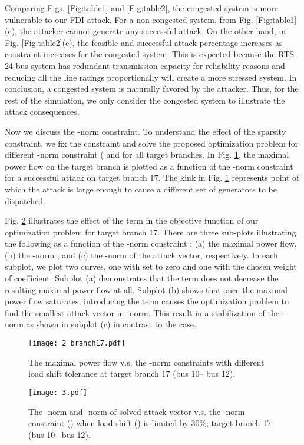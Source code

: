 \documentclass[twocolumn,english,final,journal]{IEEEtran}
\theoremstyle{plain}
\theoremstyle{definition}
\begin{document}
Comparing Figs. \ref{Fig:table1} and \ref{Fig:table2}, the congested
system is more vulnerable to our FDI attack. For a non-congested system,
from Fig. \ref{Fig:table1}(c), the attacker cannot generate any successful
attack. On the other hand, in Fig. \ref{Fig:table2}(c), the feasible
and successful attack percentage increases as  constraint
increases for the congested system. This is expected because the RTS-24-bus
system has redundant transmission capacity for reliability reasons
and reducing all the line ratings proportionally will create a more
stressed system. In conclusion, a congested system
is naturally favored by the attacker. Thus, for the rest of the simulation,
we only consider the congested system to illustrate the attack consequences. 

Now we discuss the -norm constraint. To understand the effect
of the sparsity constraint, we fix the  constraint and solve the proposed optimization problem for different -norm
constraint ( and for all target branches. In Fig. \ref{fig:Branch 17 _Pmx},
the maximal power flow on the target branch is plotted as a function
of the -norm constraint for a successful attack on target
branch 17. The kink in Fig. \ref{fig:Branch 17 _Pmx} represents point of which the attack is large enough to cause a different set of generators to be dispatched.

Fig. \ref{fig:Branch17_L0L1} illustrates the effect of the 
term in the objective function of our optimization problem for target
branch 17. There are three sub-plots  illustrating
the following as a function of the -norm constraint :
(a) the maximal power flow, (b) the -norm , and (c) the -norm
of the attack vector, respectively. In each subplot, we plot two curves,
one with  set to zero and one with the chosen weight of 
coefficient. Subplot (a) demonstrates that the  term does
not decrease the resulting maximal power flow at all. Subplot (b) shows that
once the maximal power flow saturates,  introducing the  term causes
the optimization problem to find the smallest attack vector in -norm.
This result in a stabilization of the -norm as shown in subplot
(c) in contrast to the  case.

\begin{figure}[h]
\texttt{[image: 2\_branch17.pdf]}
\caption{The maximal power flow v.s. the  -norm constraints with different
load shift tolerance at target branch 17 (bus 10-- bus 12).\label{fig:Branch 17 _Pmx} }
\end{figure}


\begin{figure}[tbh]
\texttt{[image: 3.pdf]}
\caption{The -norm and -norm of solved attack vector  v.s.
the -norm constraint () when load shift ()
is limited by 30\%; target branch 17 (bus 10-- bus 12).\label{fig:Branch17_L0L1}}
\end{figure}
\end{document}
